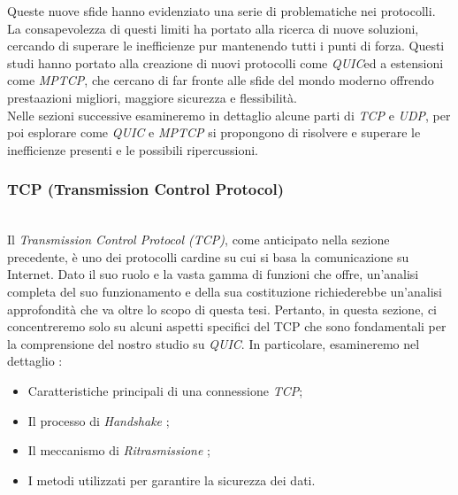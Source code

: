 Queste nuove sfide hanno evidenziato una serie di problematiche nei protocolli. La consapevolezza di questi limiti ha portato alla ricerca di nuove soluzioni, cercando di superare le inefficienze pur mantenendo tutti i punti di forza.
Questi studi hanno portato alla creazione di nuovi protocolli come \emph{QUIC}\glsfirstoccur ed a estensioni come \emph{MPTCP}\glsfirstoccur, che cercano di far fronte alle sfide del mondo moderno offrendo prestaazioni migliori, maggiore sicurezza e flessibilità.
\\
Nelle sezioni successive esamineremo in dettaglio alcune parti di \emph{TCP} e \emph{UDP}, per poi esplorare come \emph{QUIC} e \emph{MPTCP} si propongono di risolvere e superare le inefficienze presenti e le possibili ripercussioni.

\subsubsection{TCP (Transmission Control Protocol)}
~\\
\indent Il \emph{Transmission Control Protocol (TCP)}, come anticipato nella sezione precedente, è uno dei protocolli cardine su cui si basa la comunicazione su Internet. Dato il suo ruolo e la vasta gamma di funzioni che offre, un'analisi completa del suo funzionamento e della sua costituzione richiederebbe un'analisi approfondità che va oltre lo scopo di questa tesi. Pertanto, in questa sezione, ci concentreremo solo su alcuni aspetti specifici del TCP che sono fondamentali per la comprensione del nostro studio su \emph{QUIC}. 
In particolare, esamineremo nel dettaglio :
\begin{itemize}
    \item Caratteristiche principali di una connessione \emph{TCP};
    
    \item Il processo di \emph{Handshake} \glsfirstoccur;
    
    \item Il meccanismo di \emph{Ritrasmissione \glsfirstoccur};
    
    \item I metodi utilizzati per garantire la sicurezza dei dati.
\end{itemize}

